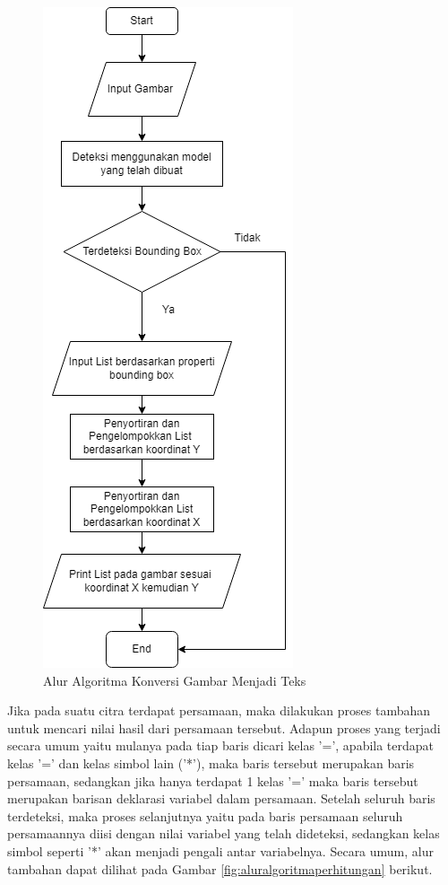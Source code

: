 \begin{figure}[H]
    \centering
    \includegraphics[scale=0.7]{gambar/model_deteksi.png}
    \caption{Alur Algoritma Konversi Gambar Menjadi Teks}
    \label{fig:aluralgoritmakonversi}
\end{figure}
\par

Jika pada suatu citra terdapat persamaan, maka dilakukan proses tambahan untuk mencari nilai hasil dari persamaan tersebut. Adapun proses yang terjadi secara umum yaitu mulanya pada tiap baris dicari kelas '=', apabila terdapat kelas '=' dan kelas simbol lain ('*'), maka baris tersebut merupakan baris persamaan, sedangkan jika hanya terdapat 1 kelas '=' maka baris tersebut merupakan barisan deklarasi variabel dalam persamaan. Setelah seluruh baris terdeteksi, maka proses selanjutnya yaitu pada baris persamaan seluruh persamaannya diisi dengan nilai variabel yang telah dideteksi, sedangkan kelas simbol seperti '*' akan menjadi pengali antar variabelnya. Secara umum, alur tambahan dapat dilihat pada Gambar \ref*{fig:aluralgoritmaperhitungan} berikut. \par

